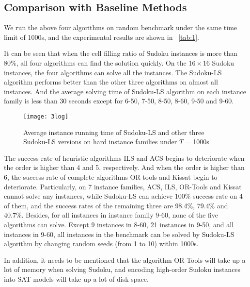 \documentclass{article}
\begin{document}
\subsection{Comparison with Baseline Methods}

We run the above four algorithms on random benchmark under the same time limit of 1000s, and the experimental results are shown in \tablename~\ref{tab:1}.

It can be seen that when the cell filling ratio of Sudoku instances is more than 80\%, all four algorithms can find the solution quickly. On the $16 \times 16$ Sudoku instances, the four algorithms can solve all the instances. The Sudoku-LS algorithm performs better than the other three algorithms on almost all instances. And the average solving time of Sudoku-LS algorithm on each instance family is less than 30 seconds except for 6-50, 7-50, 8-50, 8-60, 9-50 and 9-60.

\begin{figure*}[t]
    \centering
    \texttt{[image: 3log]}
    \caption{Average instance running time of Sudoku-LS and other three Sudoku-LS versions on hard instance families under $T$ = 1000s}
    \label{fig:3}
\end{figure*}

The success rate of heuristic algorithms ILS and ACS begins to deteriorate when the order is higher than 4 and 5, respectively. And when the order is higher than 6, the success rate of complete algorithms OR-tools and Kissat begin to deteriorate. Particularly, on 7 instance families, ACS, ILS, OR-Tools and Kissat cannot solve any instances, while Sudoku-LS can achieve 100\% success rate on 4 of them, and the success rates of the remaining three are 98.4\%, 79.4\% and 40.7\%. Besides, for all instances in instance family 9-60, none of the five algorithms can solve. Except 9 instances in 8-60, 21 instances in 9-50, and all instances in 9-60, all instances in the benchmark can be solved by Sudoku-LS algorithm by changing random seeds (from 1 to 10) within 1000s.

In addition, it needs to be mentioned that the algorithm OR-Tools will take up a lot of memory when solving Sudoku, and encoding high-order Sudoku instances into SAT models will take up a lot of disk space.

\end{document}
